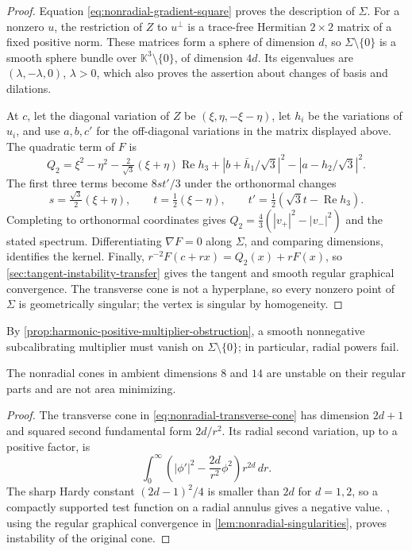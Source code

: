 \begin{proof}
Equation \eqref{eq:nonradial-gradient-square} proves the description
of \(\Sigma\). For a nonzero \(u\), the restriction of \(Z\)
to \(u^\perp\) is a trace-free Hermitian \(2\times2\) matrix
of a fixed positive norm. These matrices form a sphere of dimension
\(d\), so \(\Sigma\setminus\{0\}\) is a smooth sphere bundle
over \(\mathbb K^3\setminus\{0\}\), of dimension \(4d\).
Its eigenvalues are \((\lambda,-\lambda,0)\), \(\lambda>0\),
which also proves the assertion about changes of basis and dilations.

At \(c\), let the diagonal variation of \(Z\) be
\((\xi,\eta,-\xi-\eta)\), let \(h_i\) be the variations of
\(u_i\), and use \(a,b,c'\) for the off-diagonal variations
in the matrix displayed above. The quadratic term of \(F\) is
\[
 Q_2=\xi^2-\eta^2-\tfrac2{\sqrt3}(\xi+\eta)
             \operatorname{Re}h_3
       +|b+\bar h_1/\sqrt3|^2-|a-h_2/\sqrt3|^2.
\]
The first three terms become \(8st'/3\) under the orthonormal
changes
\[
 s=\tfrac{\sqrt3}{2}(\xi+\eta),\qquad
 t=\tfrac12(\xi-\eta),\qquad
 t'=\tfrac12(\sqrt3t-\operatorname{Re}h_3).
\]
Completing to orthonormal coordinates gives
\(Q_2=\frac43(|v_+|^2-|v_-|^2)\) and the stated spectrum.
Differentiating \(\nabla F=0\) along \(\Sigma\), and comparing
dimensions, identifies the kernel. Finally,
\(r^{-2}F(c+rx)=Q_2(x)+rF(x)\), so
\cref{sec:tangent-instability-transfer} gives the tangent and smooth
regular graphical convergence.
The transverse cone is not a hyperplane, so every nonzero point of
\(\Sigma\) is geometrically singular; the vertex is singular by homogeneity.
\end{proof}

By \cref{prop:harmonic-positive-multiplier-obstruction}, a smooth
nonnegative subcalibrating multiplier must vanish on
\(\Sigma\setminus\{0\}\); in particular, radial powers fail.

\begin{proposition}\label{prop:nonradial-unstable}
The nonradial cones in ambient dimensions \(8\) and \(14\)
are unstable on their regular parts and are not area minimizing.
\end{proposition}

\begin{proof}
The transverse cone in \eqref{eq:nonradial-transverse-cone} has
dimension \(2d+1\) and squared second fundamental form
\(2d/r^2\). Its radial second variation, up to a positive factor,
is
\[
 \int_0^\infty\left(|\phi'|^2-\frac{2d}{r^2}\phi^2\right)
                                                      r^{2d}\,dr.
\]
The sharp Hardy constant \((2d-1)^2/4\) is smaller than \(2d\)
for \(d=1,2\), so a compactly supported test function on a radial
annulus gives a negative value. ,
using the regular graphical convergence in \cref{lem:nonradial-singularities},
proves instability of the original cone.
\end{proof}

